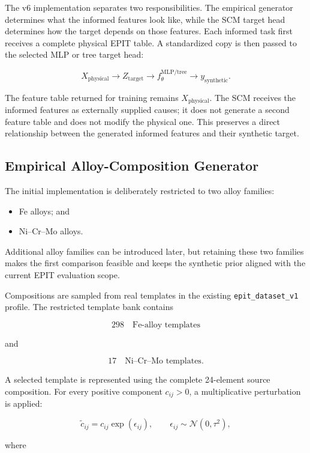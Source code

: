 \documentclass{article}
\begin{document}
The v6 implementation separates two responsibilities. The empirical generator
determines what the informed features look like, while the SCM target head
determines how the target depends on those features. Each informed task first
receives a complete physical EPIT table. A standardized copy is then passed to
the selected MLP or tree target head:

\[
X_{\mathrm{physical}}
\longrightarrow
Z_{\mathrm{target}}
\longrightarrow
f_{\theta}^{\mathrm{MLP/tree}}
\longrightarrow
y_{\mathrm{synthetic}}.
\]

The feature table returned for training remains
\(X_{\mathrm{physical}}\). The SCM receives the informed features as
externally supplied causes; it does not generate a second feature table and
does not modify the physical one. This preserves a direct relationship between
the generated informed features and their synthetic target.

\subsection{Empirical Alloy-Composition Generator}

The initial implementation is deliberately restricted to two alloy families:

\begin{itemize}
    \item Fe alloys; and
    \item Ni--Cr--Mo alloys.
\end{itemize}

Additional alloy families can be introduced later, but retaining these two
families makes the first comparison feasible and keeps the synthetic prior
aligned with the current EPIT evaluation scope.

Compositions are sampled from real templates in the existing
\texttt{epit\_dataset\_v1} profile. The restricted template bank contains

\[
298
\quad\text{Fe-alloy templates}
\]

and

\[
17
\quad\text{Ni--Cr--Mo templates}.
\]

A selected template is represented using the complete 24-element source
composition. For every positive component \(c_{ij}>0\), a multiplicative
perturbation is applied:

\[
\widetilde c_{ij}
=
c_{ij}\exp(\epsilon_{ij}),
\qquad
\epsilon_{ij}
\sim
\mathcal{N}(0,\tau^2),
\]

where
\end{document}
